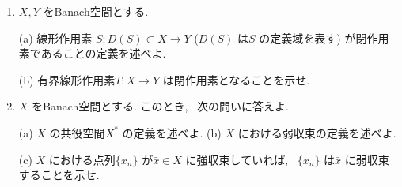\documentclass{jsarticle}
\begin{document}
\begin{enumerate}
\vspace{16zw}

\item
$X, Y$ をBanach空間とする.

(a) 線形作用素 $S: D(S) \subset X \to Y$ ($D(S)$ は$S$ の定義域を表す) が閉作用素であることの定義を述べよ.

(b) 有界線形作用素$T:X \to Y$ は閉作用素となることを示せ.

\vspace{18zw}

\item
$X$ をBanach空間とする. このとき, \ 次の問いに答えよ.

(a) $X$ の共役空間$X^*$ の定義を述べよ. \hspace{8zw}
(b) $X$ における弱収束の定義を述べよ.

(c) $X$ における点列$\{x_n\}$ が$\bar{x} \in X$ に強収束していれば, \ $\{x_n\}$ は$\bar{x}$ に弱収束することを示せ.
 
\end{enumerate}
\end{document}
